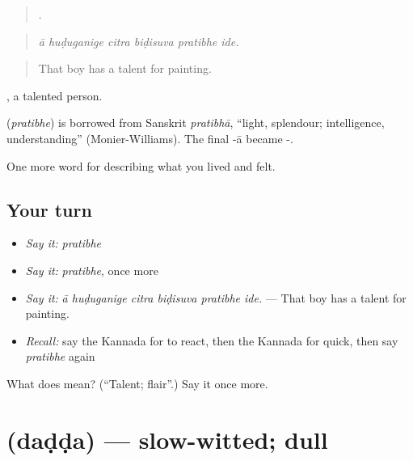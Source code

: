 \begin{quote}
     .
\end{quote}

\begin{quote}
\emph{ā huḍuganige citra biḍisuva pratibhe ide.}
\end{quote}

\begin{quote}
That boy has a talent for painting.
\end{quote}

, a talented person.

\begin{cousinweb}
\textbf{} (\emph{pratibhe}) is borrowed from Sanskrit \emph{pratibhā}, \textquotedblleft{}light, splendour; intelligence, understanding\textquotedblright{} (Monier-Williams). The final -ā became -.
\end{cousinweb}

\begin{grammarlens}[title={What you've built}]
One more word for describing what you lived and felt.
\end{grammarlens}

\subsection*{Your turn}
\begin{itemize}
\raggedright
  \item \emph{Say it:} \emph{pratibhe}
  \item \emph{Say it:} \emph{pratibhe}, once more
  \item \emph{Say it:} \emph{ā huḍuganige citra biḍisuva pratibhe ide.} — That boy has a talent for painting.
  \item \emph{Recall:} say the Kannada for to react, then the Kannada for quick, then say \emph{pratibhe} again
\end{itemize}

\begin{tcolorbox}[breakable,colback=teal!4,colframe=teal!35!black,title={Before you move on}]
What does  mean? (\textquotedblleft{}Talent; flair\textquotedblright{}.) Say it once more.
\end{tcolorbox}
\section[\texorpdfstring{\kn{ದಡ್ಡ} (daḍḍa)}{ದಡ್ಡ (daḍḍa)}]{ (daḍḍa) — slow-witted; dull}

